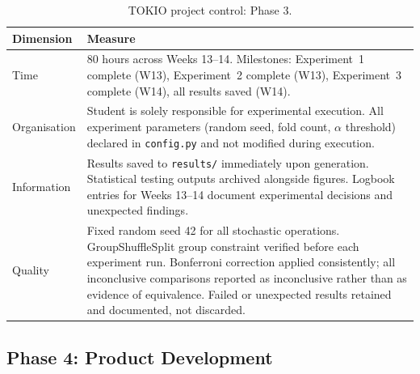 \documentclass[11pt,a4paper]{article}
\begin{document}
\begin{table}[H]
  \centering
  \caption{TOKIO project control: Phase 3.}
  \label{tab:tokio3}
  \small
  \begin{tabular}{p{2.2cm} p{11cm}}
    \toprule
    \textbf{Dimension} & \textbf{Measure} \\
    \midrule
    Time         & 80 hours across Weeks 13--14. Milestones: Experiment~1 complete (W13), Experiment~2 complete (W13), Experiment~3 complete (W14), all results saved (W14). \\
    Organisation & Student is solely responsible for experimental execution. All experiment parameters (random seed, fold count, $\alpha$ threshold) declared in \texttt{config.py} and not modified during execution. \\
    Information  & Results saved to \texttt{results/} immediately upon generation. Statistical testing outputs archived alongside figures. Logbook entries for Weeks 13--14 document experimental decisions and unexpected findings. \\
    Quality      & Fixed random seed 42 for all stochastic operations. GroupShuffleSplit group constraint verified before each experiment run. Bonferroni correction applied consistently; all inconclusive comparisons reported as inconclusive rather than as evidence of equivalence. Failed or unexpected results retained and documented, not discarded. \\
    \bottomrule
  \end{tabular}
\end{table}

\subsection{Phase 4: Product Development}
\end{document}
